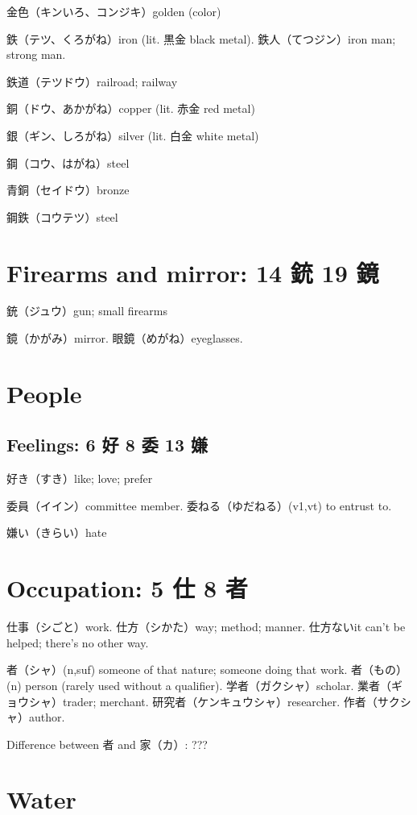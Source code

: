 金色（キンいろ、コンジキ）golden (color)

鉄（テツ、くろがね）iron (lit. 黒金 black metal).
鉄人（てつジン）iron man; strong man.

鉄道（テツドウ）railroad; railway

銅（ドウ、あかがね）copper (lit. 赤金 red metal)

銀（ギン、しろがね）silver (lit. 白金 white metal)

鋼（コウ、はがね）steel

青銅（セイドウ）bronze

鋼鉄（コウテツ）steel

\section{Firearms and mirror: 14 銃 19 鏡}

銃（ジュウ）gun; small firearms

鏡（かがみ）mirror.
眼鏡（めがね）eyeglasses.

\section{People}

\subsection{Feelings: 6 好 8 委 13 嫌}

好き（すき）like; love; prefer

委員（イイン）committee member.
委ねる（ゆだねる）(v1,vt) to entrust to.

嫌い（きらい）hate

\section{Occupation: 5 仕 8 者}

仕事（シごと）work.
仕方（シかた）way; method; manner.
仕方ないit can't be helped; there's no other way.

者（シャ）(n,suf) someone of that nature; someone doing that work.
者（もの）(n) person (rarely used without a qualifier).
学者（ガクシャ）scholar.
業者（ギョウシャ）trader; merchant.
研究者（ケンキュウシャ）researcher.
作者（サクシャ）author.

Difference between 者 and 家（カ）: ???

\section{Water}

